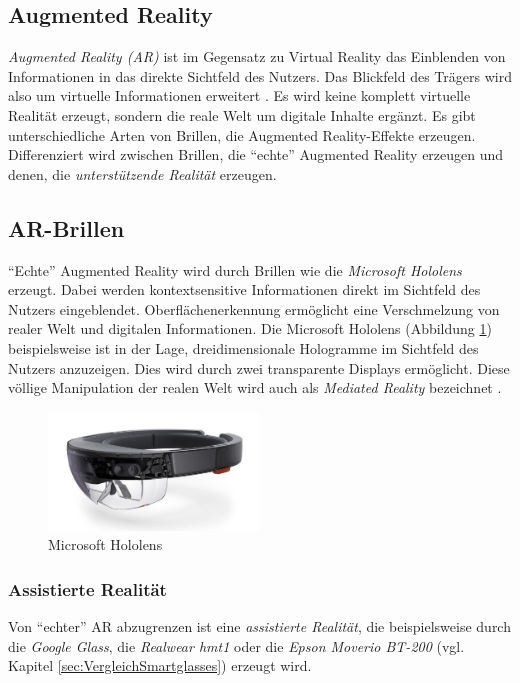 \subsection{Augmented Reality}
%
\emph{Augmented Reality (AR)} ist im Gegensatz zu Virtual Reality das Einblenden von Informationen in das direkte Sichtfeld des Nutzers. Das Blickfeld des Trägers wird also um virtuelle Informationen erweitert \cite[S.~26]{Schwenke2016}. Es wird keine komplett virtuelle Realität erzeugt, sondern die reale Welt um digitale Inhalte ergänzt. Es gibt  unterschiedliche Arten von Brillen, die Augmented Reality-Effekte erzeugen. Differenziert wird zwischen Brillen, die \enquote{echte} Augmented Reality erzeugen und denen, die \emph{unterstützende Realität} erzeugen.
%
\subsection*{AR-Brillen}
%
\enquote{Echte} Augmented Reality wird durch Brillen wie die \emph{Microsoft Hololens} erzeugt. Dabei werden kontextsensitive Informationen direkt im Sichtfeld des Nutzers eingeblendet. Oberflächenerkennung ermöglicht eine Verschmelzung von realer Welt und digitalen Informationen. Die Microsoft Hololens (Abbildung \ref{fig:Microsoft_Hololens}) beispielsweise ist in der Lage, dreidimensionale Hologramme im Sichtfeld des Nutzers anzuzeigen. Dies wird durch zwei transparente Displays ermöglicht. Diese völlige Manipulation der realen Welt wird auch als \emph{Mediated Reality} bezeichnet \cite[S.~46]{Schwenke2016}.
%
\begin{figure}[htbp]
    \centering
    \includegraphics[width=0.5\textwidth]{data/bilder/Microsoft_Hololens.pdf}
    \caption{Microsoft Hololens \cite{O.V.}}
    \label{fig:Microsoft_Hololens}
\end{figure}
%
%

\subsubsection{Assistierte Realität}
\label{sec:AssistierteRealitaet}
%
Von \enquote{echter} AR abzugrenzen ist eine \emph{assistierte Realität}, die beispielsweise durch die \emph{Google Glass}, die \emph{Realwear hmt1} oder die \emph{Epson Moverio BT-200} (vgl. Kapitel \ref{sec:VergleichSmartglasses}) erzeugt wird.


